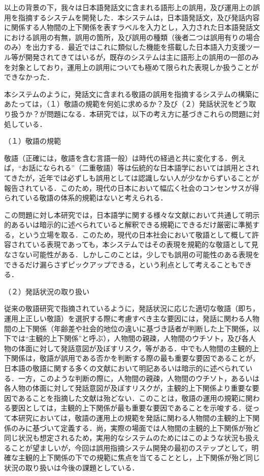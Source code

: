 以上の背景の下，我々は日本語発話文に含まれる語形上の誤用，及び運用上の誤用を指摘するシステムを開発した．本システムは，日本語発話文，及び発話内容に関係する人物間の上下関係を表すラベルを入力とし，入力された日本語発話文における誤用の有無，誤用の箇所，及び誤用の種類（後者二つは誤用有りの場合のみ）を出力する．最近ではこれに類似した機能を搭載した日本語入力支援ツール等が開発されてきてはいるが，既存のシステムは主に語形上の誤用の一部のみを対象としており，運用上の誤用についても極めて限られた表現しか扱うことができなかった．

本システムのように，発話文に含まれる敬語の誤用を指摘するシステムの構築にあたっては，（１）敬語の規範を何処に求めるか？及び（２）発話状況をどう取り扱うか？が問題になる．本研究では，以下の考え方に基づきこれらの問題に対処している．

（１）敬語の規範

敬語（正確には，敬語を含む言語一般）は時代の経過と共に変化する．例えば，``お話になられる''（二重敬語）等は伝統的な日本語学においては誤用とされてきたが，近年では必ずしも誤用としては認識しない人が少なからずいることが報告されている\cite{Bunkacho1999}．このため，現代の日本において幅広く社会のコンセンサスが得られている敬語の体系的規範はないと考えられる．

この問題に対し本研究では，日本語学に関する様々な文献において共通して明示的あるいは暗示的に述べられていると解釈できる規範にできるだけ厳密に準拠する，という立場を取る．このため，現代の日本社会において敬語として概して許容されている表現であっても，本システムではその表現を規範的な敬語として見なさない可能性がある．しかしこのことは，少しでも誤用の可能性のある表現をできるだけ漏らさずピックアップできる，という利点として考えることもできる．

（２）発話状況の取り扱い

従来の敬語研究で指摘されているように，発話状況に応じた適切な敬語（即ち，運用上正しい敬語）を選択する際に考慮すべき主な要因には，発話に関わる人物間の上下関係（年齢差や社会的地位の違いに基づき話者が判断した上下関係，以下では``主観的上下関係''と呼ぶ），人物間の親疎，人物間のウチソト，及び各人物の体面に対して発話意図が及ぼすリスク，等がある．中でも人物間の主観的上下関係は，敬語が誤用である否かを判断する際の最も重要な要因であることが，日本語の敬語に関する多くの文献において明記あるいは暗示的に述べられている\cite[等]{Kikuchi1996,Kikuchi1997,Kabaya1998,Kokugoken1990,Kokugoken1992,Minami1987}．一方，このような判断の際に，人物間の親疎，人物間のウチソト，あるいは各人物の体面に対して発話意図が及ぼすリスクが，主観的上下関係より重要な要因であることを指摘した文献は殆どない．このことは，敬語の運用の規範に関わる要因としては，主観的上下関係が最も重要な要因であることを示唆する．従って本研究においては，敬語の運用上の規範を発話に関わる人物間の主観的上下関係のみに基づいて定義する．尚，実際の場面では人物間の主観的上下関係が殆ど同じ状況も想定されるため，実用的なシステムのためにはこのような状況も扱えることが望ましいが，今回は誤用指摘システム開発の最初のステップとして，明確な主観的上下関係の下での規範に焦点を当てることとし，上下関係が殆ど同じ状況の取り扱いは今後の課題としている．

